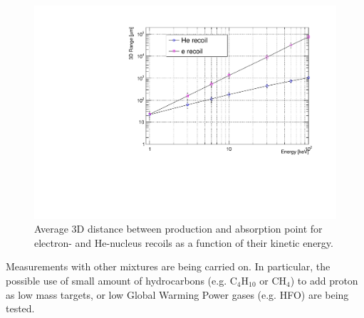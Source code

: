 \documentclass[physics,article,submit,moreauthors,pdftex]{Definitions/mdpi}
\newcommand{\lemon}{{\textsc{Lemon}}\xspace}
\begin{document}
\begin{figure}[t!]
  \begin{center}
    \includegraphics[width=0.49\linewidth]{range_ER_NR.pdf}
    \caption{Average 3D distance between production and absorption point for electron- and He-nucleus recoils as a function of their kinetic energy.}
      \label{fig:range}
      \end{center}
\end{figure}


Measurements with other mixtures are being carried on. In particular, the possible use of small amount of hydrocarbons (e.g. C$_4$H$_{10}$ or CH$_4$) to add proton as low mass targets, or low Global Warming Power gases (e.g. HFO) are being tested.






\end{document}
